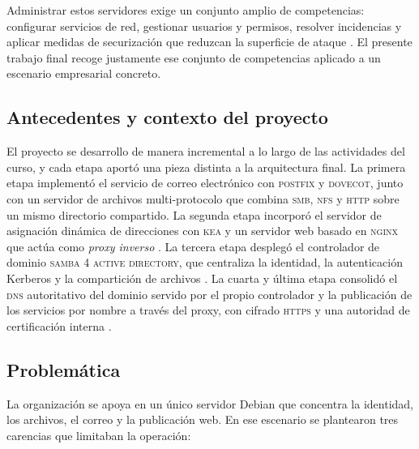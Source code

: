 Administrar estos servidores exige un conjunto amplio de competencias:
configurar servicios de red, gestionar usuarios y permisos, resolver
incidencias y aplicar medidas de securizaci\'on que reduzcan la
superficie de ataque \cite{nemeth2017}. El presente trabajo final
recoge justamente ese conjunto de competencias aplicado a un escenario
empresarial concreto.

\subsection{Antecedentes y contexto del proyecto}

El proyecto se desarrollo de manera incremental a lo largo de las
actividades del curso, y cada etapa aport\'o una pieza distinta a la
arquitectura final. La primera etapa implement\'o el servicio de correo
electr\'onico con \textsc{postfix} y \textsc{dovecot}, junto con un servidor
de archivos multi-protocolo que combina \textsc{smb}, \textsc{nfs} y
\textsc{http} sobre un mismo directorio compartido. La segunda etapa
incorpor\'o el servidor de asignaci\'on din\'amica de direcciones con
\textsc{kea} y un servidor web basado en \textsc{nginx} que act\'ua como
\textit{proxy inverso} \cite{keaDocs, nginxDocs}. La tercera etapa
despleg\'o el controlador de dominio \textsc{samba 4} \textsc{active
directory}, que centraliza la identidad, la autenticaci\'on Kerberos y la
compartici\'on de archivos \cite{sambateam2024, msft_activedirectory}. La
cuarta y \'ultima etapa consolid\'o el \textsc{dns} autoritativo del dominio
servido por el propio controlador y la publicaci\'on de los servicios por
nombre a trav\'es del proxy, con cifrado \textsc{https} y una autoridad de
certificaci\'on interna \cite{iscbind9, opensslDocs}.

\subsection{Problem\'atica}

La organizaci\'on se apoya en un \'unico servidor Debian que
concentra la identidad, los archivos, el correo y la publicaci\'on web. En
ese escenario se plantearon tres carencias que limitaban la operaci\'on:

